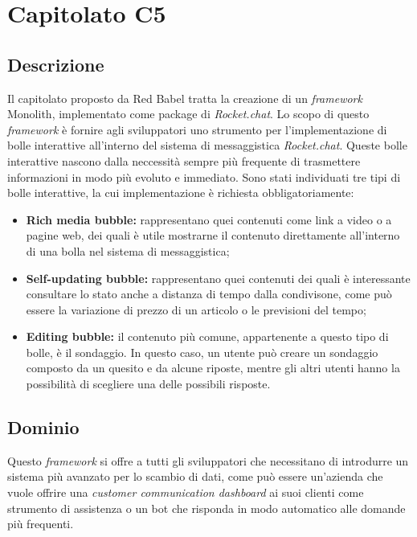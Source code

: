 \newpage
\section{Capitolato C5}

\subsection{Descrizione}

Il capitolato proposto da Red Babel tratta la creazione di un \textit{framework} Monolith, implementato come package di \textit{Rocket.chat}. Lo scopo di questo
\textit{framework} è fornire agli sviluppatori uno strumento per l'implementazione di bolle interattive all'interno del sistema di messaggistica \textit{Rocket.chat}.
Queste bolle interattive nascono dalla neccessità sempre più frequente di trasmettere informazioni in modo più evoluto e immediato.
Sono stati individuati tre tipi di bolle interattive, la cui implementazione è richiesta obbligatoriamente:

\begin{itemize}
	\item \textbf{Rich media bubble:} rappresentano quei contenuti come link a video
	o a pagine web, dei quali è utile mostrarne il contenuto direttamente all'interno di una bolla nel sistema di messaggistica;
	\item \textbf{Self-updating bubble:} rappresentano quei contenuti dei quali è interessante
	consultare lo stato anche a distanza di tempo dalla condivisone, come
	può essere la variazione di prezzo di un articolo o le previsioni del tempo;
	\item \textbf{Editing bubble:} il contenuto più comune, appartenente a questo tipo di bolle, è il sondaggio. In questo caso, un utente può creare un sondaggio
	composto da un quesito e da alcune riposte, mentre gli altri utenti hanno la possibilità di scegliere una delle possibili risposte.
\end{itemize}


\subsection{Dominio}

Questo \textit{framework} si offre a tutti gli sviluppatori che necessitano di introdurre un sistema più avanzato per lo scambio di dati, come può essere un'azienda che vuole offrire una \textit{customer communication dashboard} ai suoi clienti come strumento di assistenza o un bot che risponda in modo automatico alle domande più frequenti. 

